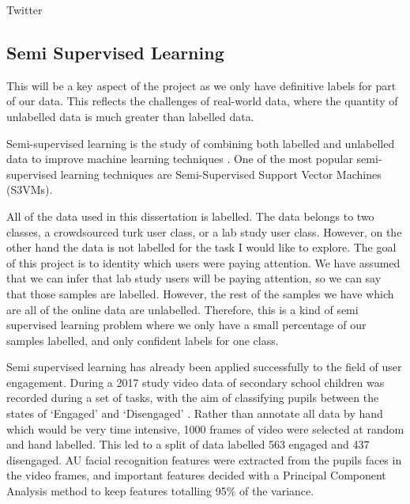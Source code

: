 \documentclass{article}
\begin{document}
Twitter




\subsection{Semi Supervised Learning}
This will be a key aspect of the project as we only have definitive labels for part of our data.
This reflects the challenges of real-world data, where the quantity of unlabelled data is much greater than labelled data.

Semi-supervised learning is the study of combining both labelled and unlabelled data to improve machine learning techniques \cite{zhu2009introduction}.
One of the most popular semi-supervised learning techniques are Semi-Supervised Support Vector Machines (S3VMs).




All of the data used in this dissertation is labelled.
The data belongs to two classes, a crowdsourced turk user class, or a lab study user class.
However, on the other hand the data is not labelled for the task I would like to explore.
The goal of this project is to identity which users were paying attention.
We have assumed that we can infer that lab study users will be paying attention, so we can say that those samples are labelled.
However, the rest of the samples we have which are all of the online data are unlabelled.
Therefore, this is a kind of semi supervised learning problem where we only have a small percentage of our samples labelled, and only confident labels for one class.

Semi supervised learning has already been applied successfully to the field of user engagement.
During a 2017 study video data of secondary school children was recorded during a set of tasks, with the aim of classifying pupils between the states of `Engaged' and `Disengaged' \cite{nezami2017semi}.
Rather than annotate all data by hand which would be very time intensive, 1000 frames of video were selected at random and hand labelled.
This led to a split of data labelled 563 engaged and 437 disengaged.
AU facial recognition features were extracted from the pupils faces in the video frames, and important features decided with a Principal Component Analysis method to keep features totalling 95\% of the variance.
\end{document}
